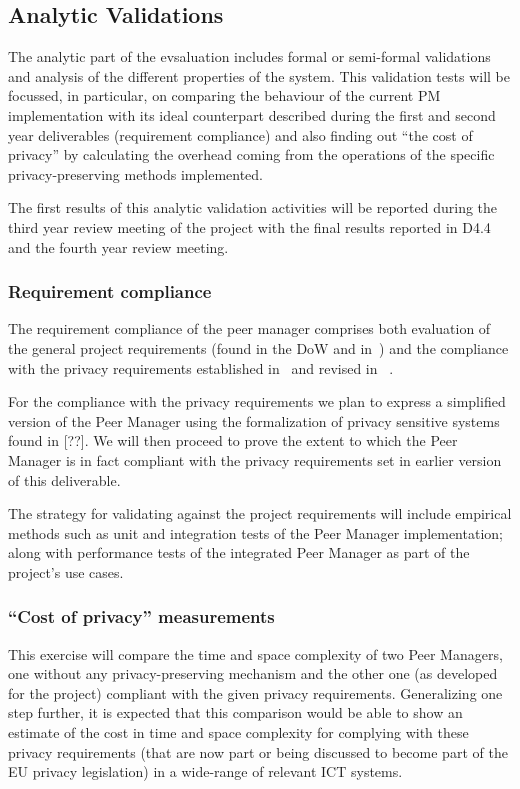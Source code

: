 \subsection{Analytic Validations}
The analytic part of the evsaluation includes formal or semi-formal validations and analysis of the different properties of the system. This validation tests will be focussed, in particular, on comparing the behaviour of the current PM implementation with its ideal counterpart described during the first and second year deliverables (requirement compliance) and also finding out ``the cost of privacy'' by calculating the overhead %
coming from the operations of the specific privacy-preserving methods implemented.

The first results of this analytic validation activities will be reported during the third year review meeting of the project with the final results reported in D4.4 and the fourth year review meeting.

\subsubsection{Requirement compliance}
The requirement compliance of the peer manager comprises both evaluation of the general project requirements (found in the DoW and in~\cite{D1.1}) and the compliance with the privacy requirements established in~\cite{D4.1} and revised in ~\cite{D4.2}.

For the compliance with the privacy requirements we plan to express a simplified version of the Peer Manager using the formalization of privacy sensitive systems found in [??].  We will then proceed to prove the extent to which the %
Peer Manager is in fact compliant with the privacy requirements set in earlier version of this deliverable. 

The strategy for validating against the project requirements will include empirical methods such as unit and integration tests of the Peer Manager implementation; along with performance tests of the integrated Peer Manager as part of the project's use cases. %

\subsubsection{``Cost of privacy'' measurements}
This exercise will compare the time and space complexity of two Peer Managers, one without any privacy-preserving mechanism and the other one (as developed for the project) compliant with the given privacy requirements. Generalizing one step further, it is expected that this comparison would be able to show an estimate of the cost in time and space complexity for complying with these privacy requirements (that are now part or being discussed to become part of the EU privacy legislation) in a wide-range of relevant ICT systems.


